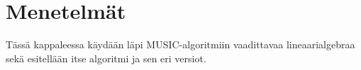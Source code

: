 \section{Menetelmät}
Tässä kappaleessa käydään läpi MUSIC-algoritmiin vaadittavaa lineaarialgebraa sekä esitellään itse algoritmi ja sen eri versiot.











